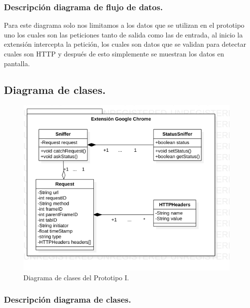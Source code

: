 \documentclass[12pt, a4paper, titlepage]{report}
\begin{document}
			    \subsubsection{Descripción diagrama de flujo de datos.}  
			    Para este diagrama solo nos limitamos a los datos que se utilizan en el prototipo uno los cuales son las peticiones tanto de salida como las de entrada, al inicio la extensión intercepta la petición, los cuales son datos que se validan para detectar cuales son HTTP y después de esto simplemente se muestran los datos en pantalla.
			    
			\subsection{Diagrama de clases.}
				\begin{figure}[H]
					\begin{center}	\includegraphics[width=13cm]{./imagenes/Desarrollo/Prototipo_1/DC_P1.png}
					\caption{Diagrama de clases del Prototipo I.}
					\end{center}
				\end{figure}
			
			\subsubsection{Descripción diagrama de clases.}
			    
\end{document}
